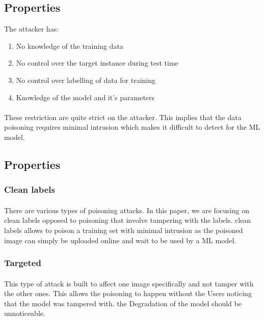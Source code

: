 \documentclass{article}
\begin{document}
\subsection{Properties}

The attacker has:
\begin{enumerate}
  \item No knowledge of the training data
  \item No control over the target instance during test time
  \item No control over labelling of data for training
  \item Knowledge of the model and it's parameters
\end{enumerate}
\paragraph{}
These restriction are quite strict on the attacker. This implies that the data poisoning requires minimal intrusion which makes it difficult to detect for the ML model.
\subsection{Properties}

\subsubsection*{Clean labels}
\paragraph{}
There are various types of poisoning attacks. In this paper, we are focusing on clean labels opposed to poisoning that involve tampering with the labels. clean labels allows to poison a training set with minimal intrusion as the poisoned image can simply be uploaded online and wait to be used by a ML model.

\subsubsection*{Targeted}
\paragraph{}
This type of attack is built to affect one image specifically and not tamper with the other ones. This allows the poisoning to happen without the Users noticing that the model was tampered with. the Degradation of the model should be unnoticeable.
\end{document}
